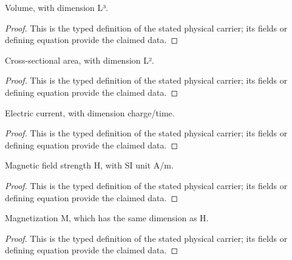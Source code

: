 \begin{definition}
  \label{def:physics:IPhO_2026_3_A_3:aux002}
  Volume, with dimension L³.
\end{definition}
\begin{proof}
  This is the typed definition of the stated physical carrier; its fields or defining equation provide the claimed data.
\end{proof}

\begin{definition}
  \label{def:physics:IPhO_2026_3_A_3:aux003}
  Cross-sectional area, with dimension L².
\end{definition}
\begin{proof}
  This is the typed definition of the stated physical carrier; its fields or defining equation provide the claimed data.
\end{proof}

\begin{definition}
  \label{def:physics:IPhO_2026_3_A_3:aux004}
  Electric current, with dimension charge/time.
\end{definition}
\begin{proof}
  This is the typed definition of the stated physical carrier; its fields or defining equation provide the claimed data.
\end{proof}

\begin{definition}
  \label{def:physics:IPhO_2026_3_A_3:aux005}
  Magnetic field strength H, with SI unit A/m.
\end{definition}
\begin{proof}
  This is the typed definition of the stated physical carrier; its fields or defining equation provide the claimed data.
\end{proof}

\begin{definition}
  \label{def:physics:IPhO_2026_3_A_3:aux006}
  Magnetization M, which has the same dimension as H.
\end{definition}
\begin{proof}
  This is the typed definition of the stated physical carrier; its fields or defining equation provide the claimed data.
\end{proof}

